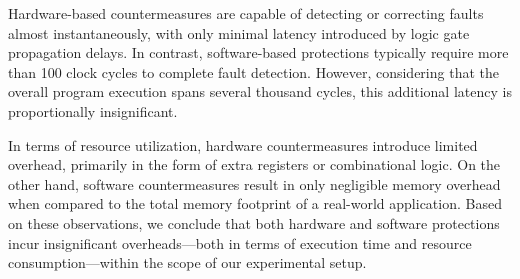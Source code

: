 Hardware-based countermeasures are capable of detecting or correcting faults almost instantaneously, with only minimal latency introduced by logic gate propagation delays. In contrast, software-based protections typically require more than 100 clock cycles to complete fault detection. However, considering that the overall program execution spans several thousand cycles, this additional latency is proportionally insignificant.

In terms of resource utilization, hardware countermeasures introduce limited overhead, primarily in the form of extra registers or combinational logic. On the other hand, software countermeasures result in only negligible memory overhead when compared to the total memory footprint of a real-world application. Based on these observations, we conclude that both hardware and software protections incur insignificant overheads—both in terms of execution time and resource consumption—within the scope of our experimental setup.

